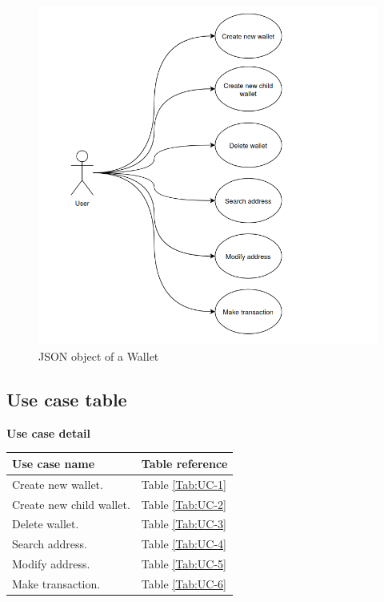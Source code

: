 \begin{figure}[ht!]
    \centering
    \includegraphics[width=1\textwidth]{images/usecases.png}
    \caption[General JSON object of a Wallet]{JSON object of a Wallet}
    \label{fig:usecases}
\end{figure}

\newpage
\subsection{Use case table}

\bigskip
{\textbf{Use case detail}}

\begin{table}[b]
    \begin{tabular}{| m{8cm} | m{6cm} |}
        \hline
        Use case name            & Table reference      \\ \hline
        Create new wallet.       & Table \ref{Tab:UC-1} \\ \hline
        Create new child wallet. & Table \ref{Tab:UC-2} \\ \hline
        Delete wallet.           & Table \ref{Tab:UC-3} \\ \hline
        Search address.          & Table \ref{Tab:UC-4} \\ \hline
        Modify address.          & Table \ref{Tab:UC-5} \\ \hline
        Make transaction.        & Table \ref{Tab:UC-6} \\ \hline
    \end{tabular}
\end{table}

